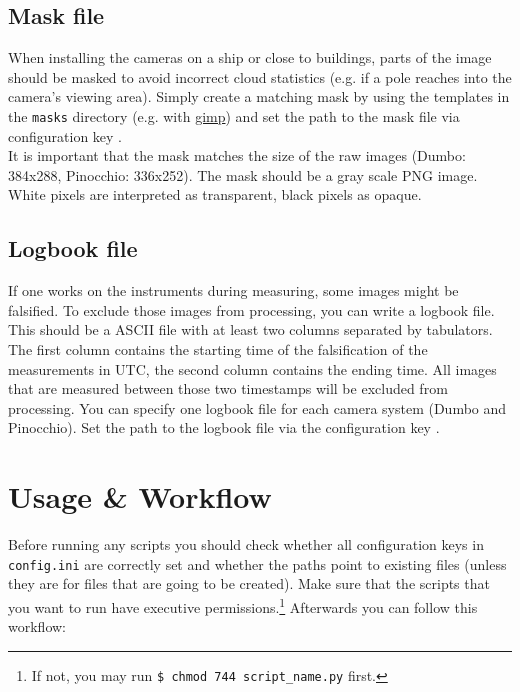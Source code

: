 \documentclass[11pt,a4paper]{article}
\begin{document}
\subsection{Mask file}
When installing the cameras on a ship or close to buildings, parts of the image should be masked to avoid incorrect cloud statistics (e.g. if a pole reaches into the camera's viewing area). Simply create a matching mask by using the templates in the \texttt{masks} directory (e.g. with \href{https://www.gimp.org}{gimp}) and set the path to the mask file via configuration key .\\
It is important that the mask matches the size of the raw images (Dumbo: 384x288, Pinocchio: 336x252). The mask should be a gray scale PNG image. White pixels are interpreted as transparent, black pixels as opaque.

\subsection{Logbook file}
If one works on the instruments during measuring, some images might be falsified. To exclude those images from processing, you can write a logbook file. This should be a ASCII file with at least two columns separated by tabulators. The first column contains the starting time of the falsification of the measurements in UTC, the second column contains the ending time. All images that are measured between those two timestamps will be excluded from processing. You can specify one logbook file for each camera system (Dumbo and Pinocchio). Set the path to the logbook file via the configuration key .\\

\section{Usage \& Workflow}
\label{sec:usage-workflow}
Before running any scripts you should check whether all configuration keys in \texttt{config.ini} are correctly set and whether the paths point to existing files (unless they are for files that are going to be created). Make sure that the scripts that you want to run have executive permissions.\footnote{If not, you may run \texttt{\$ chmod 744 script\_name.py} first.} Afterwards you can follow this workflow:
\end{document}
